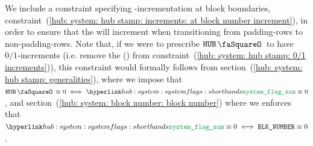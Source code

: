 \saNote{} \label{hub: system: hub stamp: why we specify the hub stamp increment at block boundaries}
We include a constraint specifying \hubStamp-incrementation at block boundaries,
constraint~(\ref{hub: system: hub stamp: increments: at block number increment}),
in order to ensure that the \hubStamp{} will increment when transitioning from padding-rows to non-padding-rows.
Note that,
if we were to prescribe $\hubStamp$ to have $0/1$-increments
(i.e. remove the (\sanityCheck) from constraint~(\ref{hub: system: hub stamp: 0/1 increments})),
this constraint would formally follows from
section~(\ref{hub: system: hub stamp: generalities}),
where we impose that $\hubStamp \equiv 0 \iff \flagSum \equiv 0$,
and section~(\ref{hub: system: block number: block number})
where we enforces that $\flagSum \equiv 0 \iff \blockNumber \equiv 0$.
